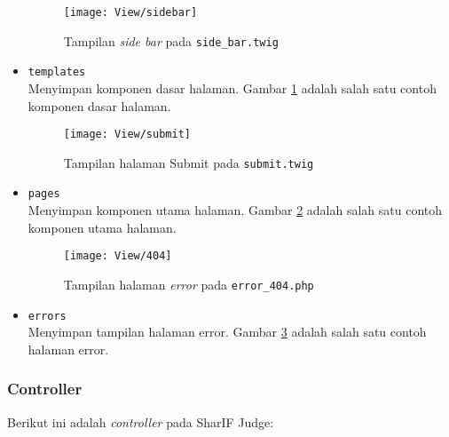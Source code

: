 \begin{itemize}
    \begin{figure}[H]
    	\centering  
    	\texttt{[image: View/sidebar]}  
    	\caption{Tampilan \textit{side bar} pada \texttt{side\_bar.twig}}
    	\label{fig:3:viewsidebar} 
    \end{figure} 
    \item \verb|templates| \\ Menyimpan komponen dasar halaman. Gambar \ref{fig:3:viewsidebar} adalah salah satu contoh komponen dasar halaman.
    
    \begin{figure}[H]
    	\centering  
    	\texttt{[image: View/submit]}  
    	\caption{Tampilan halaman Submit pada \texttt{submit.twig}}
    	\label{fig:3:viewsubmit} 
    \end{figure} 
    \item \verb|pages| \\ Menyimpan komponen utama halaman. Gambar \ref{fig:3:viewsubmit} adalah salah satu contoh komponen utama halaman.
    
    \begin{figure}[H]
    	\centering  
    	\texttt{[image: View/404]}  
    	\caption{Tampilan halaman \textit{error} pada \texttt{error\_404.php}}
    	\label{fig:3:view404} 
    \end{figure} 
	\item \verb|errors| \\ Menyimpan tampilan halaman error. Gambar \ref{fig:3:view404} adalah salah satu contoh halaman error.
\end{itemize}

\subsubsection{Controller}

Berikut ini adalah \textit{controller} pada SharIF Judge:

